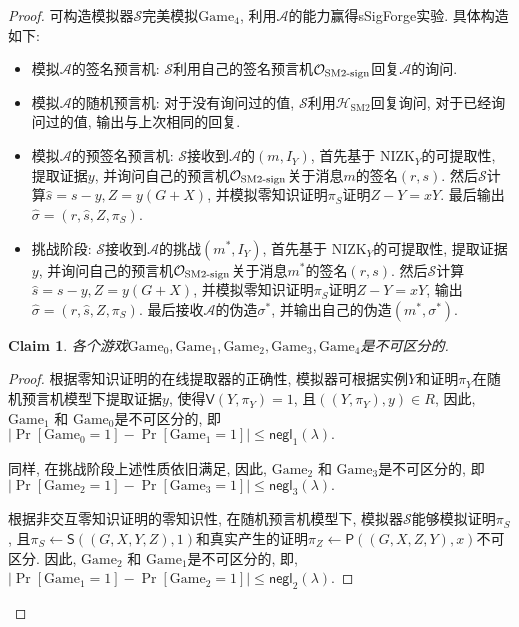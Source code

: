 \documentclass[review]{jcr}
\newtheorem{claim}{Claim}
\begin{document}
\begin{proof}
可构造模拟器$\mathcal{S}$完美模拟$\text{Game}_4$, 利用$\mathcal{A}$的能力赢得sSigForge实验. 具体构造如下: 

\begin{itemize}

\item 模拟$\mathcal{A}$的签名预言机: $\mathcal{S}$利用自己的签名预言机$\mathcal{O}_{\text{SM2\text{-}sign}}$回复$\mathcal{A}$的询问. 

\item 模拟$\mathcal{A}$的随机预言机: 对于没有询问过的值, $\mathcal{S}$利用$\mathcal{H}_{\text{SM2}}$回复询问, 对于已经询问过的值, 输出与上次相同的回复. 

\item 模拟$\mathcal{A}$的预签名预言机: $\mathcal{S}$接收到$\mathcal{A}$的$(m, I_Y)$, 首先基于 NIZK$_Y$的可提取性, 提取证据$y$, 并询问自己的预言机$\mathcal{O}_{\text{SM2\text{-}sign}}$关于消息$m$的签名$(r, s)$. 然后$\mathcal{S}$计算$\hat{s} = s - y, Z=y(G+X)$, 并模拟零知识证明$\pi_S$证明$Z-Y=xY$. 最后输出$\hat{\sigma}=(r, \hat{s}, Z, \pi_S)$. 

\item 挑战阶段: $\mathcal{S}$接收到$\mathcal{A}$的挑战$(m^*,I_Y)$, 首先基于 NIZK$_Y$的可提取性, 提取证据$y$, 并询问自己的预言机$\mathcal{O}_{\text{SM2\text{-}sign}}$关于消息$m^*$的签名$(r, s)$. 然后$\mathcal{S}$计算$\hat{s} = s - y, Z=y(G+X)$, 并模拟零知识证明$\pi_S$证明$Z-Y=xY$, 输出$\hat{\sigma}=(r, \hat{s}, Z, \pi_S)$. 最后接收$\mathcal{A}$的伪造$\sigma^*$, 并输出自己的伪造$(m^*, \sigma^*)$.

\end{itemize}

\begin{claim}
各个游戏$\text{Game}_0,\text{Game}_1,\text{Game}_2,\text{Game}_3,\text{Game}_4$是不可区分的.
\end{claim}

\begin{proof}
根据零知识证明的在线提取器的正确性, 模拟器可根据实例$Y$和证明$\pi_Y$在随机预言机模型下提取证据$y$, 使得$\mathsf{V}(Y, \pi_Y) = 1$, 且$((Y, \pi_Y), y) \in R$, 因此, $\text{Game}_1$ 和 $\text{Game}_0$是不可区分的, 即$|\Pr[\text{Game}_0 = 1] - \Pr[\text{Game}_1 = 1]|\leq\mathsf{negl}_1(\lambda).$

同样, 在挑战阶段上述性质依旧满足, 因此, $\text{Game}_2$ 和 $\text{Game}_3$是不可区分的, 即$|\Pr[\text{Game}_2 = 1] - \Pr[\text{Game}_3 = 1]|\leq\mathsf{negl}_3(\lambda).$

根据非交互零知识证明的零知识性, 在随机预言机模型下, 模拟器$\mathcal{S}$能够模拟证明$\pi_S$, 且$\pi_S\leftarrow \mathsf{S}((G,X,Y,Z),1)$和真实产生的证明$\pi_Z\leftarrow \mathsf{P}((G,X,Z, Y), x)$不可区分. 因此, $\text{Game}_2$ 和 $\text{Game}_1$是不可区分的, 即, $|\Pr[\text{Game}_1 = 1] - \Pr[\text{Game}_2 = 1]|\leq \mathsf{negl}_2(\lambda).$


\end{proof}
\end{proof}
\end{document}
